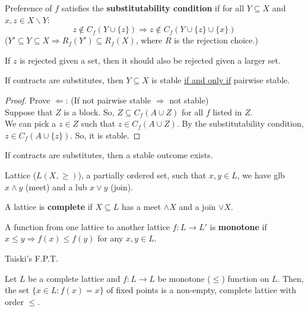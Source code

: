 \documentclass[11pt]{elegantbook}
\begin{document}
\begin{definition}
    \normalfont
    Preference of $f$ satisfies the \textbf{substitutability condition} if for all $Y\subseteq X$ and $x,z\in X\backslash Y$:
    $$z\notin C_f(Y\cup\{z\}) \Rightarrow z\notin C_f(Y\cup\{z\}\cup\{x\})$$
    ($Y'\subseteq Y\subseteq X \Rightarrow R_f(Y')\subseteq R_f(X)$, where $R$ is the rejection choice.)
\end{definition}
If $z$ is rejected given a set, then it should also be rejected given a larger set.


\begin{theorem}
    If contracts are substitutes, then $Y\subseteq X$ is stable \underline{if and only if} pairwise stable.
\end{theorem}
\begin{proof}
    Prove $\Leftarrow$:
    (If not pairwise stable $\Rightarrow$ not stable)\\
    Suppose that $Z$ is a block. So, $Z\subseteq C_f(A\cup Z)$ for all $f$ listed in $Z$.\\
    We can pick a $z\in Z$ such that $z\in C_f(A\cup Z)$. By the substitutability condition, $z\in C_f(A\cup \{z\})$. So, it is stable.
\end{proof}

\begin{theorem}
    If contracts are substitutes, then a stable outcome exists.
\end{theorem}

\begin{definition}[Lattice]
    \normalfont
    Lattice ($L(X,\geq)$), a partially ordered set, such that $x,y\in L$, we have glb $x \wedge y$ (meet) and a lub $x \vee y$ (join).
\end{definition}


\begin{definition}
    \normalfont
    A lattice is \textbf{complete} if $X\subseteq L$ has a meet $\wedge X$ and a join $\vee X$.
\end{definition}

\begin{definition}
    \normalfont
    A function from one lattice to another lattice $f:L \rightarrow L'$ is \textbf{monotone} if $x\leq y \Rightarrow f(x)\leq f(y)$ for any $x,y\in L$.
\end{definition}

Taiski's F.P.T.
\begin{theorem}
    Let $L$ be a complete lattice and $f: L \rightarrow L$ be monotone ($\leq$) function on $L$. Then, the set $\{x\in L: f(x)=x\}$ of fixed points is a non-empty, complete lattice with order $\leq$.
\end{theorem}
\end{document}
